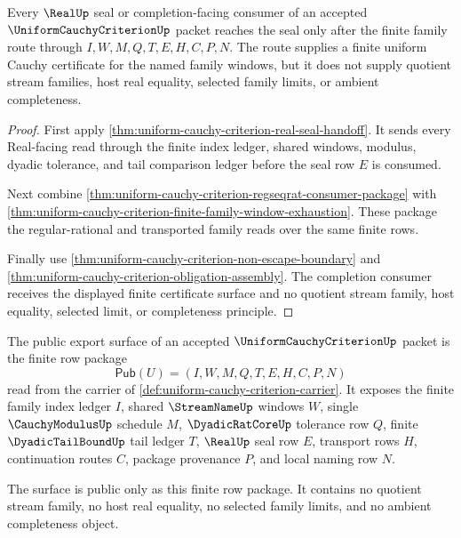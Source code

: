 \begin{theorem}
\label{thm:uniform-cauchy-criterion-real-seal-completion-boundary}
Every $\RealUp$ seal or completion-facing consumer of an accepted
$\UniformCauchyCriterionUp$ packet reaches the seal only after the finite
family route through $I,W,M,Q,T,E,H,C,P,N$. The route supplies a finite uniform
Cauchy certificate for the named family windows, but it does not supply
quotient stream families, host real equality, selected family limits, or
ambient completeness.
\end{theorem}
\begin{proof}
First apply \autoref{thm:uniform-cauchy-criterion-real-seal-handoff}. It sends
every Real-facing read through the finite index ledger, shared windows,
modulus, dyadic tolerance, and tail comparison ledger before the seal row $E$
is consumed.

Next combine
\autoref{thm:uniform-cauchy-criterion-regseqrat-consumer-package} with
\autoref{thm:uniform-cauchy-criterion-finite-family-window-exhaustion}. These
package the regular-rational and transported family reads over the same
finite rows.

Finally use \autoref{thm:uniform-cauchy-criterion-non-escape-boundary} and
\autoref{thm:uniform-cauchy-criterion-obligation-assembly}. The completion
consumer receives the displayed finite certificate surface and no quotient
stream family, host equality, selected limit, or completeness principle.
\end{proof}

\begin{definition}
\label{def:uniform-cauchy-criterion-public-export-surface}
The public export surface of an accepted $\UniformCauchyCriterionUp$ packet is the finite row package
$$
\mathsf{Pub}(U)=(I,W,M,Q,T,E,H,C,P,N)
$$
read from the carrier of \autoref{def:uniform-cauchy-criterion-carrier}. It exposes the finite family index ledger $I$, shared $\StreamNameUp$ windows $W$, single $\CauchyModulusUp$ schedule $M$, $\DyadicRatCoreUp$ tolerance row $Q$, finite $\DyadicTailBoundUp$ tail ledger $T$, $\RealUp$ seal row $E$, transport rows $H$, continuation routes $C$, package provenance $P$, and local naming row $N$.

The surface is public only as this finite row package. It contains no quotient stream family, no host real equality, no selected family limits, and no ambient completeness object.
\end{definition}

